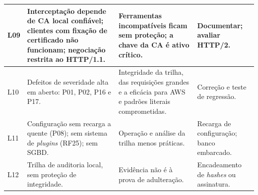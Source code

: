 {\begin{longtable}{|p{1.0cm}|p{6.3cm}|p{4.1cm}|p{3.3cm}|}
L09 & Interceptação depende de CA local confiável; clientes com fixação de certificado não funcionam; negociação restrita ao HTTP/1.1. & Ferramentas incompatíveis ficam sem proteção; a chave da CA é ativo crítico. & Documentar; avaliar HTTP/2. \\ \hline
L10 & Defeitos de severidade alta em aberto: P01, P02, P16 e P17. & Integridade da trilha, das requisições grandes e a eficácia para AWS e padrões literais comprometidas. & Correção e teste de regressão. \\ \hline
L11 & Configuração sem recarga a quente (P08); sem sistema de \textit{plugins} (RF25); sem SGBD. & Operação e análise da trilha menos práticas. & Recarga de configuração; banco embarcado. \\ \hline
L12 & Trilha de auditoria local, sem proteção de integridade. & Evidência não é à prova de adulteração. & Encadeamento de \textit{hashes} ou assinatura. \\ \hline
\end{longtable}
}
\noindent{}
